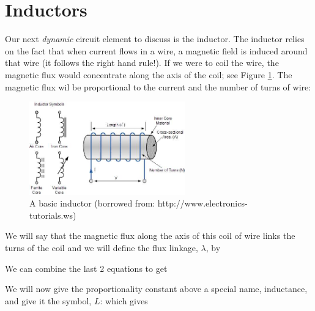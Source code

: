 \documentclass{handout}
\begin{document}
\newpage
\clearpage
\pagebreak

\section{Inductors}
Our next {\em dynamic} circuit element to discuss is the inductor.  The inductor relies on the fact that when current flows in a wire, a magnetic field is induced around that wire (it follows the right hand rule!).  If we were to coil the wire, the magnetic flux would concentrate along the axis of the coil; see Figure \ref{fig: Inductor}. The magnetic flux wil be proportional to the current and the number of turns of wire:

\begin{figure} [h!]
\centering
\includegraphics[width=0.6\textwidth]{Inductor.jpg}
\caption{A basic inductor (borrowed from: http://www.electronics-tutorials.ws)}
\label{fig: Inductor}
\end{figure}

We will say that the magnetic flux along the axis of this coil of wire links the turns of the coil and we will define the flux linkage, $\lambda$, by

We can combine the last 2 equations to get

We will now give the proportionality constant above a special name, inductance, and give it the symbol, $L$:
which gives
\end{document}
